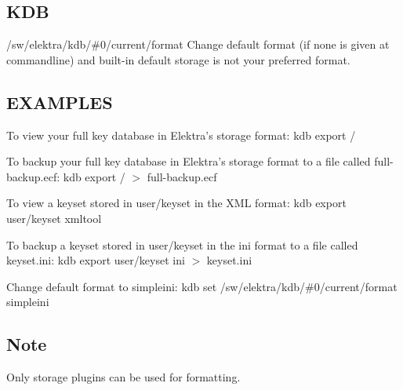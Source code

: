 \subsection*{K\+DB}


\begin{DoxyItemize}
\item {\ttfamily /sw/elektra/kdb/\#0/current/format} Change default format (if none is given at commandline) and built-\/in default {\ttfamily storage} is not your preferred format.
\end{DoxyItemize}

\subsection*{E\+X\+A\+M\+P\+L\+ES}

To view your full key database in Elektra’s {\ttfamily storage} format\+: {\ttfamily kdb export /}

To backup your full key database in Elektra’s {\ttfamily storage} format to a file called {\ttfamily full-\/backup.\+ecf}\+: {\ttfamily kdb export / $>$ full-\/backup.\+ecf}

To view a keyset stored in {\ttfamily user/keyset} in the X\+ML format\+: {\ttfamily kdb export user/keyset xmltool}

To backup a keyset stored in {\ttfamily user/keyset} in the {\ttfamily ini} format to a file called {\ttfamily keyset.\+ini}\+: {\ttfamily kdb export user/keyset ini $>$ keyset.\+ini}

Change default format to {\ttfamily simpleini}\+: {\ttfamily kdb set /sw/elektra/kdb/\#0/current/format simpleini}

\subsection*{Note}


\begin{DoxyItemize}
\item Only storage plugins can be used for formatting. 
\end{DoxyItemize}
